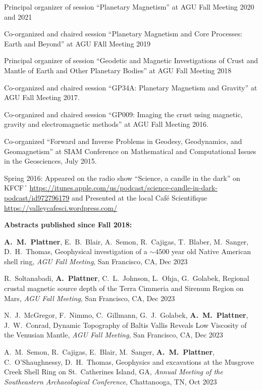 \documentclass[10pt]{article}
\begin{document}
\spcp
Principal organizer of session ``Planetary Magnetism'' at AGU Fall Meeting 2020 and 2021

\spcp Co-organized and chaired session ``Planetary Magnetism
and Core Processes: Earth and Beyond'' at AGU FAll Meeting 2019

\spcp Principal organizer of session ``Geodetic and Magnetic
Investigations of Crust and Mantle of Earth and Other Planetary
Bodies'' at AGU Fall Meeting 2018

\spcp
Co-organized and chaired session
``GP34A: Planetary Magnetism and Gravity''
at AGU Fall Meeting 2017.
          
\spcp
Co-organized and chaired session
``GP009: Imaging the crust using magnetic, gravity and electromagnetic methods''
at AGU Fall Meeting 2016.

\spcp Co-organized ``Forward and Inverse Problems in Geodesy,
Geodynamics, and Geomagnetism'' at SIAM Conference on Mathematical and
Computational Issues in the Geosciences, July 2015.

\spcp
Spring 2016: Appeared on the radio show ``Science, a candle in the dark'' on KFCF´
\url{https://itunes.apple.com/us/podcast/science-candle-in-dark-podcast/id972796179} and Presented at the local Caf\'e Scientifique \url{https://valleycafesci.wordpress.com/}


\spc
\textbf{\tsize Abstracts published since Fall 2018:}

\spcp
\textbf{A.~M.~Plattner}, E.~B.~Blair, A.~Semon, R.~Cajigas, T.~Blaber, M.~Sanger, D.~H.~Thomas, Geophysical investigation of a $\sim4500$ year old Native American shell ring, \emph{AGU Fall Meeting}, San Francisco, CA, Dec 2023

\spcp
R.~Soltanabadi, \textbf{A.~Plattner}, C.~L.~Johnson, L.~Ohja, G.~Golabek, Regional crustal magnetic source depth of the Terra Cimmeria and Sirenum Region on Mars, \emph{AGU Fall Meeting}, San Francisco, CA, Dec 2023 

\spcp
N.~J.~McGregor, F.~Nimmo, C.~Gillmann, G.~J.~Golabek, \textbf{A.~M.~Plattner}, J.~W.~Conrad, Dynamic Topography of Baltis Vallis Reveals Low Viscosity of the Venusian Mantle, \emph{AGU Fall Meeting}, San Francisco, CA, Dec 2023

\spcp
A.~M.~Semon, R.~Cajigas, E.~Blair, M.~Sanger, \textbf{A.~M.~Plattner}, C.~O'Shaughnessy, D.~H.~Thomas, Geophysics and excavations at the Musgrove Creek Shell Ring on St.\ Catherines Island, GA, \emph{Annual Meeting of the Southeastern Archaeological Conference}, Chattanooga, TN, Oct 2023
\end{document}
